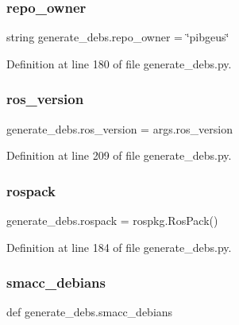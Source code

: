 \subsubsection{\texorpdfstring{repo\+\_\+owner}{repo\_owner}}
{\footnotesize\ttfamily string generate\+\_\+debs.\+repo\+\_\+owner = \char`\"{}pibgeus\char`\"{}}



Definition at line 180 of file generate\+\_\+debs.\+py.

\mbox{\label{namespacegenerate__debs_af69f35c2a04a4cc8bd6b9805ab436872}} 
\subsubsection{\texorpdfstring{ros\+\_\+version}{ros\_version}}
{\footnotesize\ttfamily generate\+\_\+debs.\+ros\+\_\+version = args.\+ros\+\_\+version}



Definition at line 209 of file generate\+\_\+debs.\+py.

\mbox{\label{namespacegenerate__debs_a609fa33c1ebbff173ec90524eeb7b49d}} 
\subsubsection{\texorpdfstring{rospack}{rospack}}
{\footnotesize\ttfamily generate\+\_\+debs.\+rospack = rospkg.\+Ros\+Pack()}



Definition at line 184 of file generate\+\_\+debs.\+py.

\mbox{\label{namespacegenerate__debs_acca5eaf9f83b81a32c26c7a7c5f9bdd7}} 
\subsubsection{\texorpdfstring{smacc\+\_\+debians}{smacc\_debians}}
{\footnotesize\ttfamily def generate\+\_\+debs.\+smacc\+\_\+debians}

